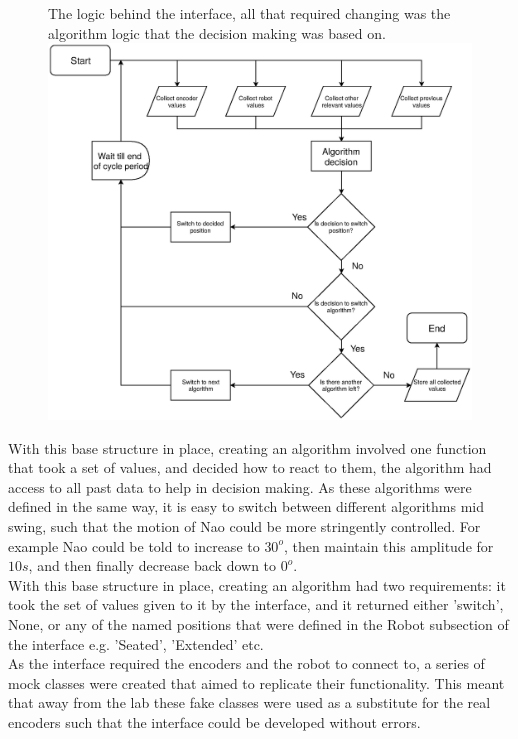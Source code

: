 \documentclass[11pt]{article}
\begin{document}
    \begin{figure}[!htb]
        \centering
        \captionbox
             {The logic behind the interface, all that required changing was the algorithm logic that the decision making was based on.\label{fig:InterfaceLogic}}
             {\includegraphics[width=1.0\textwidth]{InterfaceLogic.eps}}
    \end{figure}

With this base structure in place, creating an algorithm involved one function that took a set of values, and decided how to react to them, the algorithm had access to all past data to help in decision making. As these algorithms were defined in the same way, it is easy to switch between different algorithms mid swing, such that the motion of Nao could be more stringently controlled. For example Nao could be told to increase to $30^o$, then maintain this amplitude for $10s$, and then finally decrease back down to $0^o$.\\

With this base structure in place, creating an algorithm had two requirements: it took the set of values given to it by the interface, and it returned either 'switch', None, or any of the named positions that were defined in the Robot subsection of the interface e.g. 'Seated', 'Extended' etc.\\

As the interface required the encoders and the robot to connect to, a series of mock classes were created that aimed to replicate their functionality. This meant that away from the lab these fake classes were used as a substitute for the real encoders such that the interface could be developed without errors.
\end{document}
